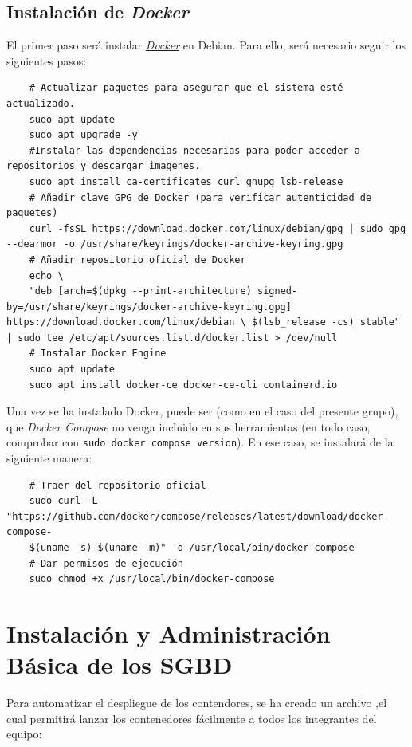 \documentclass{article}
\begin{document}
\subsection{Instalación de \textit{Docker}}\label{subsec:Instalación de la máquina virtual}
El primer paso será instalar \textit{\textcolor{blue}{\href{https://www.docker.com/}{Docker}}} en Debian. Para ello, será necesario seguir los siguientes pasos:

\begin{lstlisting}
    # Actualizar paquetes para asegurar que el sistema esté actualizado.
    sudo apt update
    sudo apt upgrade -y
    #Instalar las dependencias necesarias para poder acceder a repositorios y descargar imagenes.
    sudo apt install ca-certificates curl gnupg lsb-release
    # Añadir clave GPG de Docker (para verificar autenticidad de paquetes)
    curl -fsSL https://download.docker.com/linux/debian/gpg | sudo gpg --dearmor -o /usr/share/keyrings/docker-archive-keyring.gpg
    # Añadir repositorio oficial de Docker
    echo \
    "deb [arch=$(dpkg --print-architecture) signed-by=/usr/share/keyrings/docker-archive-keyring.gpg] https://download.docker.com/linux/debian \ $(lsb_release -cs) stable" | sudo tee /etc/apt/sources.list.d/docker.list > /dev/null
    # Instalar Docker Engine
    sudo apt update
    sudo apt install docker-ce docker-ce-cli containerd.io
\end{lstlisting}

Una vez se ha instalado Docker, puede ser (como en el caso del presente grupo), que \textit{Docker Compose} no venga incluido en sus herramientas (en todo caso, comprobar con \texttt{sudo docker compose version}). En ese caso, se instalará de la siguiente manera: 
\begin{lstlisting}
    # Traer del repositorio oficial
    sudo curl -L "https://github.com/docker/compose/releases/latest/download/docker-compose-
    $(uname -s)-$(uname -m)" -o /usr/local/bin/docker-compose
    # Dar permisos de ejecución
    sudo chmod +x /usr/local/bin/docker-compose
\end{lstlisting}
\newpage

\section{Instalación y Administración Básica de los SGBD}
Para automatizar el despliegue de los contendores, se ha creado un archivo ,el cual permitirá lanzar los contenedores fácilmente a todos los integrantes del equipo:
\end{document}

